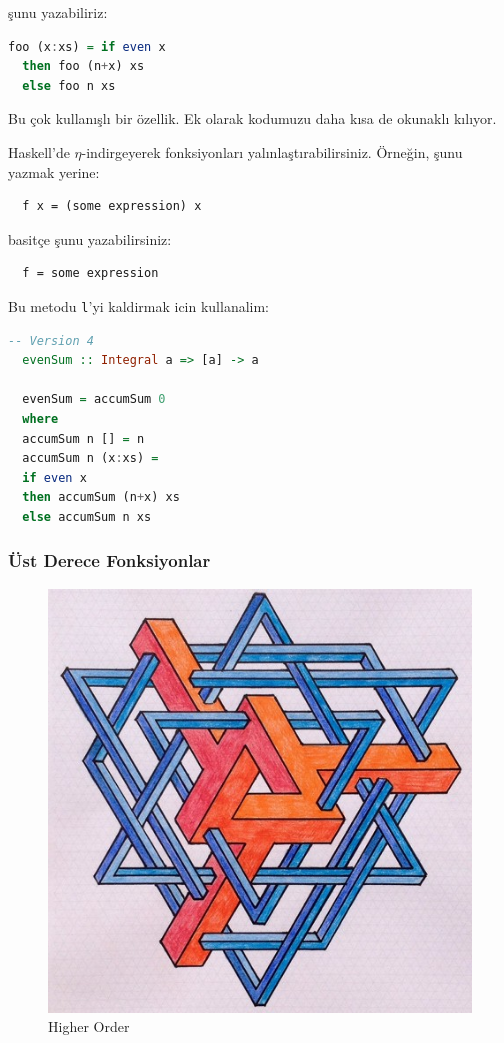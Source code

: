 \documentclass[a4paper,14pt,openany]{extbook} %
\begin{document}
şunu yazabiliriz:

\begin{lstlisting}[language=Haskell]
  foo (x:xs) = if even x
  then foo (n+x) xs
  else foo n xs
\end{lstlisting}

Bu çok kullanışlı bir özellik. Ek olarak kodumuzu daha kısa de
okunaklı kılıyor.

Haskell'de $η$-indirgeyerek
fonksiyonları yalınlaştırabilirsiniz. %
Örneğin, şunu yazmak yerine:

\begin{lstlisting}
  f x = (some expression) x
\end{lstlisting}

basitçe şunu yazabilirsiniz:

\begin{lstlisting}
  f = some expression
\end{lstlisting}

Bu metodu \lstinline!l!'yi kaldirmak icin kullanalim:

\begin{lstlisting}[language=Haskell]
  -- Version 4
  evenSum :: Integral a => [a] -> a

  evenSum = accumSum 0
  where
  accumSum n [] = n
  accumSum n (x:xs) =
  if even x
  then accumSum (n+x) xs
  else accumSum n xs
\end{lstlisting}

\subsubsection{Üst Derece Fonksiyonlar}\label{uxfcst-derece-fonksiyonlar}

\begin{figure}[htbp]
  \centering
  \includegraphics[width=0.5\linewidth]{img/escher_polygon}
  \caption{Higher Order}
\end{figure}
\end{document}
